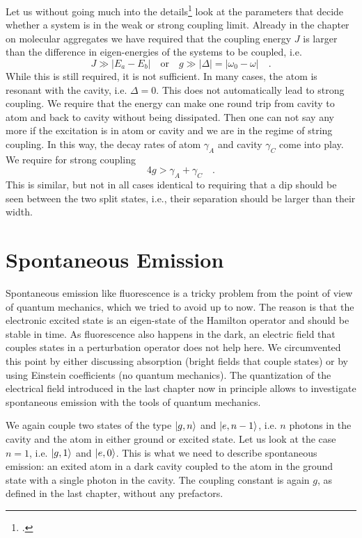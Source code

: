 Let us without going much into the details\footcite{Khitrova06,Pelton19,Thomas20} look at the parameters that decide whether a system is in the weak or strong coupling limit. Already in the chapter on molecular aggregates we have required that the coupling energy $J$ is larger than the difference in eigen-energies of the systems to be coupled, i.e.
\begin{equation}
J \gg | E_a - E_b| \quad \text{or} \quad g \gg | \Delta | = | \omega_0 - \omega | \quad .
\end{equation}
While this is still required, it is not sufficient. In many cases, the atom is resonant with the cavity, i.e. $\Delta = 0$. This does not automatically lead to strong coupling. We require that the energy can make one round trip from cavity to  atom and back to cavity without being dissipated. Then one can not say any more if the excitation is in atom or cavity and we are in the regime of string coupling. In this way, the decay rates of atom $\gamma_A$ and cavity $\gamma_C$ come into play. We require for strong coupling
\begin{equation}
4 g > \gamma_A + \gamma_C \quad .
\end{equation}
This is similar, but not in all cases  identical to requiring that a dip should be seen between the two split states, i.e., their separation should be larger than their width.


\section{Spontaneous Emission}
Spontaneous emission like fluorescence is a tricky problem from the point of view of quantum mechanics, which we tried to avoid up to now. The reason is that the electronic excited state is an eigen-state of the Hamilton operator and should be stable in time. As fluorescence also happens in the dark, an electric field that couples states in a perturbation operator does not help here. We circumvented this point by either discussing absorption (bright fields that couple states) or by using Einstein coefficients (no quantum mechanics). The quantization of the electrical field introduced in the last chapter now in principle allows to investigate spontaneous emission with the tools of quantum mechanics.

We again couple two states of the type $\ket{g, n}$ and $\ket{e, n-1}$, i.e. $n$ photons in the cavity and the atom in either ground or excited state. Let us look at the case $n=1$, i.e. $\ket{g, 1}$ and $\ket{e, 0}$. This is what we need to describe spontaneous emission: an exited atom in a dark cavity coupled to the atom in the ground state with a single photon in the cavity. The coupling constant is again $g$, as defined in the last chapter, without any prefactors.


